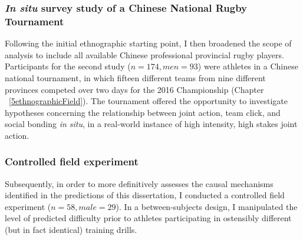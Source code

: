 \begin{CJK}{UTF8}{gbsn}
\subsubsection{\textit{In situ} survey study of a Chinese National
 Rugby Tournament}
  Following the initial ethnographic starting point, I then broadened the scope of analysis to include all available Chinese professional provincial rugby players. Participants for the second study ($n = 174, men = 93$) were athletes in a Chinese national tournament, in which fifteen different teams from nine different provinces competed over two days for the 2016 Championship (Chapter ~\ref{5ethnographicField}).  The tournament offered the opportunity to investigate hypotheses concerning the relationship between joint action, team click, and social bonding \textit{in situ}, in a real-world instance of high intensity, high stakes joint action.

\subsubsection{Controlled field experiment}
  Subsequently, in order to more definitively assesses the causal mechanisms identified in the predictions of this dissertation, I conducted a controlled field experiment ($n = 58, male = 29$). In a between-subjects design, I manipulated the level of predicted difficulty prior to athletes participating in ostensibly different (but in fact identical) training drills.





\end{CJK}
